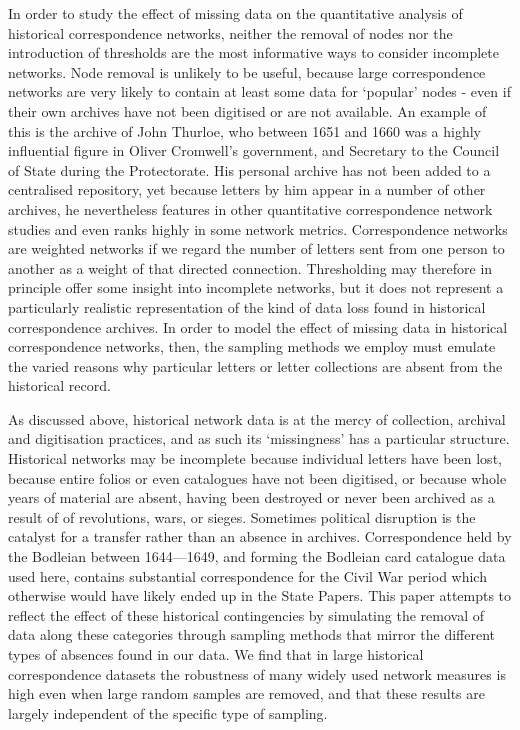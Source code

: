 \documentclass[]{article}
\begin{document}
In order to study the effect of missing data on the quantitative analysis of historical correspondence networks, neither the removal of nodes nor the introduction of thresholds are the most informative ways to consider incomplete networks. Node removal is unlikely to be useful, because large correspondence networks are very likely to contain at least some data for `popular' nodes - even if their own archives have not been digitised or are not available. An example of this is the archive of John Thurloe, who between 1651 and 1660 was a highly influential figure in Oliver Cromwell's government, and Secretary to the Council of State during the Protectorate. His personal archive has not been added to a centralised repository, yet because letters by him appear in a number of other archives, he nevertheless features in other quantitative correspondence network studies and even ranks highly in some network metrics. Correspondence networks are weighted networks if we regard the number of letters sent from one person to another as a weight of that directed connection. Thresholding may therefore in principle offer some insight into incomplete networks, but it does not represent a particularly realistic representation of the kind of data loss found in historical correspondence archives. In order to model the effect of missing data in historical correspondence networks, then, the sampling methods we employ must emulate the varied reasons why particular letters or letter collections are absent from the historical record.

As discussed above, historical network data is at the mercy of collection, archival and digitisation practices, and as such its `missingness' has a particular structure. Historical networks may be incomplete because individual letters have been lost, because entire folios or even catalogues have not been digitised, or because whole years of material are absent, having been destroyed or never been archived as a result of of revolutions, wars, or sieges. Sometimes political disruption is the catalyst for a transfer rather than an absence in archives. Correspondence held by the Bodleian between 1644---1649, and forming the Bodleian card catalogue data used here, contains substantial correspondence for the Civil War period which otherwise would have likely ended up in the State Papers. This paper attempts to reflect the effect of these historical contingencies by simulating the removal of data along these categories through sampling methods that mirror the different types of absences found in our data. We find that in large historical correspondence datasets the robustness of many widely used network measures is high even when large random samples are removed, and that these results are largely independent of the specific type of sampling.
\end{document}
